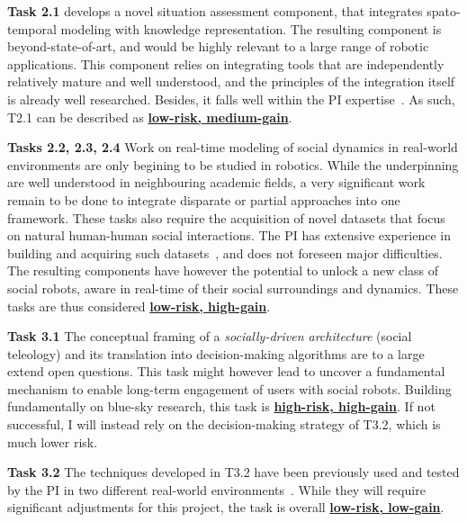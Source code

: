 \documentclass[11pt,a4paper]{report}
\begin{document}
\vspace{1em}

\textbf{Task 2.1} develops a novel situation assessment component, that
integrates spato-temporal modeling with knowledge representation. The resulting
component is beyond-state-of-art, and would be highly relevant to a large range
of robotic applications. This component relies on integrating tools that are
independently relatively mature and well understood, and the principles of the
integration itself is already well researched. Besides, it falls well within the
PI
expertise~\cite{lemaignan2018underworlds,sallami2019simulation,lemaignan2010oro}.
As such, T2.1 can be described as \ul{\bf low-risk, medium-gain}.

\textbf{Tasks 2.2, 2.3, 2.4} Work on real-time modeling of social dynamics in
real-world environments are only begining to be studied in robotics. While the
underpinning are well understood in neighbouring academic fields, a very
significant work remain to be done to integrate disparate or partial approaches
into one framework. These tasks also require the acquisition of novel datasets
that focus on natural human-human social interactions. The PI has extensive
experience in building and acquiring such
datasets~\cite{lemaignan2018pinsoro,sallami2020unexpected}, and does not
foreseen major difficulties. The resulting components have however the potential
to unlock a new class of social robots, aware in real-time of their social
surroundings and dynamics.  These tasks are thus considered \ul{\bf low-risk,
high-gain}.

\vspace{1em}

\textbf{Task 3.1} The conceptual framing of a \emph{socially-driven
architecture} (social teleology) and its translation into decision-making
algorithms are to a large extend open questions. This task might however lead to
uncover a fundamental mechanism to enable long-term engagement of users
with social robots. Building fundamentally on blue-sky research, this task is
\ul{\bf high-risk, high-gain}. If not successful, I will instead rely on the
decision-making strategy of T3.2, which is much lower risk.

\textbf{Task 3.2} The techniques developed in T3.2 have been previously used and
tested by the PI in two different real-world
environments~\cite{senft2019teaching,winkle2020couch}. While they will require
significant adjustments for this project, the task is overall \ul{\bf low-risk,
low-gain}.
\end{document}
